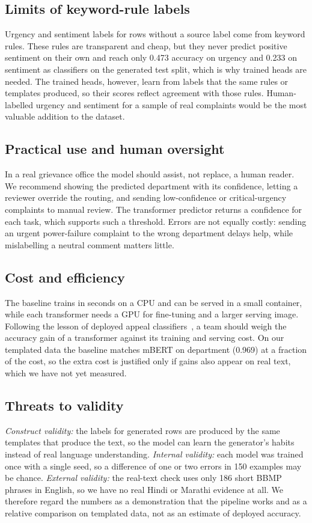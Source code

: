 \documentclass[conference]{IEEEtran}
\begin{document}
\subsection{Limits of keyword-rule labels}
Urgency and sentiment labels for rows without a source label come from keyword rules. These rules are transparent and cheap, but they never predict positive sentiment on their own and reach only 0.473 accuracy on urgency and 0.233 on sentiment as classifiers on the generated test split,
which is why trained heads are needed. The trained heads, however, learn from labels that the same rules or templates produced, so their scores reflect agreement with those rules.
Human-labelled urgency and sentiment for a sample of real complaints would be the most valuable addition to the dataset.
\subsection{Practical use and human oversight}
In a real grievance office the model should assist, not replace, a human reader. We recommend showing the predicted department with its confidence, letting a reviewer override the routing, and sending low-confidence or critical-urgency complaints to manual review.
The transformer predictor returns a confidence for each task, which supports such a threshold. Errors are not equally costly: sending an urgent power-failure complaint to the wrong department delays help, while mislabelling a neutral comment matters little.
\subsection{Cost and efficiency}
The baseline trains in seconds on a CPU and can be served in a small container, while each transformer needs a GPU for fine-tuning and a larger serving image.
Following the lesson of deployed appeal classifiers~\cite{beskorovainyi2026appeals}, a team should weigh the accuracy gain of a transformer against its training and serving cost.
On our templated data the baseline matches mBERT on department (0.969) at a fraction of the cost, so the extra cost is justified only if gains also appear on real text, which we have not yet measured.

\subsection{Threats to validity}
\emph{Construct validity:} the labels for generated rows are produced by the same templates that produce the text, so the model can learn the generator's habits instead of real language understanding.
\emph{Internal validity:} each model was trained once with a single seed, so a difference of one or two errors in 150 examples may be chance. \emph{External validity:} the real-text check uses only 186 short BBMP phrases in English, so we have no real Hindi or Marathi evidence at all.
We therefore regard the numbers as a demonstration that the pipeline works and as a relative comparison on templated data, not as an estimate of deployed accuracy.
\end{document}
